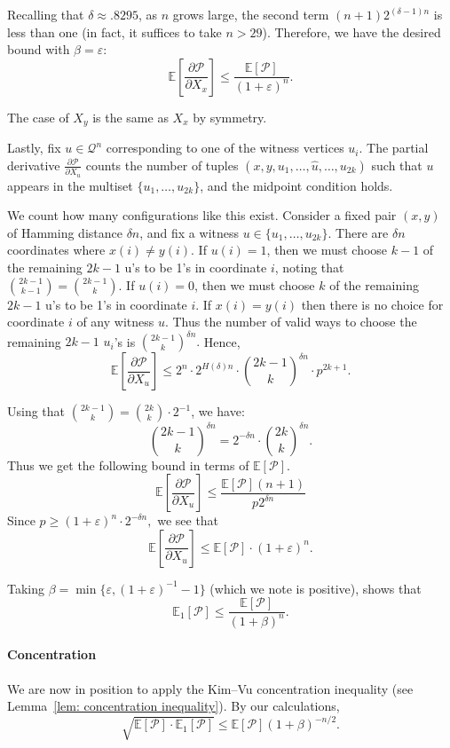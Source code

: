 \documentclass[11pt]{article}
\newcommand{\ep}{\varepsilon}
\theoremstyle{definition}
\theoremstyle{plain}
\begin{document}
Recalling that $\delta \approx .8295$, as $n$ grows large, the second term $ (n+1) 2^{(\delta-1)n}$ is less than one (in fact, it suffices to take $n > 29$). Therefore, we have the desired bound with $\beta = \ep$:
\[
\mathbb{E}\left[\frac{\partial \mathcal{P}}{\partial X_x}\right] \leq \frac{\mathbb{E}[\mathcal{P}]}{(1+\varepsilon)^n}.
\]

 The case of  \( X_y \) is the same as  \( X_x \) by symmetry.


Lastly, fix \( u \in \mathcal{Q}^n \) corresponding to one of the witness vertices \( u_i \). The partial derivative \( \frac{\partial \mathcal{P}}{\partial X_u} \) counts the number of tuples \( (x, y, u_1, \ldots, \hat{u}, \ldots, u_{2k}) \) such that \( u \) appears in the multiset \( \{u_1, \ldots, u_{2k}\} \), and the midpoint condition holds.

We count how many configurations like this exist. Consider a fixed pair \( (x, y) \) of Hamming distance \( \delta n \), and fix a witness \( u  \in \{u_1, \ldots, u_{2k}\}\). There are  \( \delta n \) coordinates where $x(i) \neq y(i).$ If $u(i) = 1$,
then we must choose \( k-1 \) of the remaining \( 2k-1 \) u's to be 1's in coordinate $i$, noting that $\binom{2k-1}{k-1} = \binom{2k-1}{k}$. If $u(i) = 0$, then we must choose \( k \) of the remaining \( 2k-1 \) u's to be 1's in coordinate $i$. If $x(i) = y(i)$ then there is no choice for coordinate $i$ of any witness $u$. Thus the number of valid ways to choose the remaining \( 2k-1 \) $u_i$'s is \(\binom{2k-1}{k}^{\delta n}. \)
Hence,
\[
\mathbb{E}\left[\frac{\partial \mathcal{P}}{\partial X_u}\right] \leq 2^n \cdot 2^{H(\delta)n} \cdot \binom{2k - 1}{k}^{\delta n} \cdot p^{2k + 1}.
\]

Using that \( \binom{2k - 1}{k} = \binom{2k}{k} \cdot 2^{-1} \), we have:
\[
\binom{2k - 1}{k}^{\delta n} =2^{-\delta n} \cdot \binom{2k}{k}^{\delta n}. 
\]
Thus we get the following bound in terms of $\mathbb{E}[\mathcal{P}]$. 
\[
\mathbb{E}\left[\frac{\partial \mathcal{P}}{\partial X_u}\right] \leq  \frac{\mathbb{E}[\mathcal{P}] (n+1) }{p 2^{\delta n} }
\]
Since \(p \geq  (1 + \varepsilon)^n \cdot 2^{-\delta n},\) we see that
\[
\mathbb{E}\left[\frac{\partial \mathcal{P}}{\partial X_u}\right] \leq \mathbb{E}[\mathcal{P}] \cdot (1 + \varepsilon)^{n}.
\]

Taking $\beta = \min \{ \ep, (1+\ep)^{-1} - 1\}$ (which we note is positive), shows that 
\[
\mathbb{E}_1[\mathcal{P}] \leq \frac{\mathbb{E}[\mathcal{P}]}{(1 + \beta)^n}.
\]
\paragraph{\bf{Concentration}}
We are now in position to apply the Kim–Vu concentration inequality (see Lemma~\ref{lem: concentration inequality}). By our calculations, 
\[ \sqrt{\mathbb{E}[\mathcal{P}] \cdot \mathbb{E}_1[\mathcal{P}]}  \leq \mathbb{E}[\mathcal{P}] (1+\beta)^{-n/2} . \]
\end{document}
